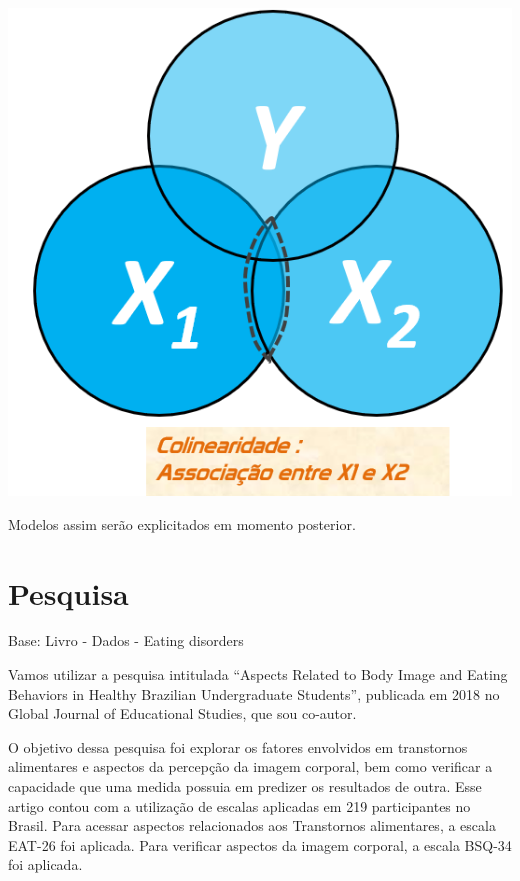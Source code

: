 \documentclass[
]{book}
\begin{document}
\includegraphics{./img/cap_reg_multipla_colinearidade.png}

Modelos assim serão explicitados em momento posterior.

\hypertarget{pesquisa-3}{%
\section{Pesquisa}\label{pesquisa-3}}

\begin{alert}

Base: Livro - Dados - Eating disorders

\end{alert}

Vamos utilizar a pesquisa intitulada ``Aspects Related to Body Image and Eating Behaviors in Healthy Brazilian Undergraduate Students'', publicada em 2018 no Global Journal of Educational Studies, que sou co-autor.

O objetivo dessa pesquisa foi explorar os fatores envolvidos em transtornos alimentares e aspectos da percepção da imagem corporal, bem como verificar a capacidade que uma medida possuia em predizer os resultados de outra. Esse artigo contou com a utilização de escalas aplicadas em 219 participantes no Brasil. Para acessar aspectos relacionados aos Transtornos alimentares, a escala EAT-26 foi aplicada. Para verificar aspectos da imagem corporal, a escala BSQ-34 foi aplicada.
\end{document}
